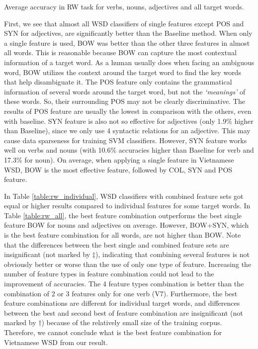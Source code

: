 \documentclass[english]{jnlp_1.4}
\begin{document}
\begin{table}[t]
\caption{Average accuracy in RW task for verbs, nouns, adjectives and all target words.}
\label{table:rw_all}

\vspace*{-1\Cvs}
\end{table}


First, we see that almost all WSD classifiers of single features 
except POS and SYN for adjectives,
are significantly better than the Baseline method.
When only a single feature is used, 
BOW was better than the other three features in almost all words.
This is reasonable because BOW can capture the most contextual information of a target word.
As a human usually does when facing an ambiguous word, 
BOW utilizes the context around the target word to find the key words that help disambiguate it. 
The POS feature only contains the grammatical information of several words around the target word,
but not the \textit{`meanings'} of these words.
So, their surrounding POS may not be clearly discriminative. 
The results of POS feature are usually the lowest in comparison with the others,
even with baseline.
SYN feature is also not so effective for adjectives
(only 1.9\% higher than Baseline),
since we only use 4 syntactic relations for an adjective. 
This may cause data sparseness for training SVM classifiers. 
However, SYN feature works well on verbs and nouns (with 10.6\% accuracies higher than Baseline for verb and 17.3\% for noun).
On average, when applying a single feature in Vietnamese WSD,
BOW is the most effective feature, followed by COL, SYN and POS feature. 

In Table \ref{table:rw_individual}, WSD classifiers with combined feature sets got equal or higher results compared to individual features
for some target words.
In Table \ref{table:rw_all}, 
the best feature combination outperforms the best single feature BOW for nouns and adjectives on average. However, 
BOW+SYN, which is the best feature combination for all words,
are not higher than BOW.
Note that the differences between the best single and combined feature sets are insignificant (not marked by $\ddagger$),
indicating that combining several features is not obviously better or worse than the use of only one type of feature.
Increasing the number of feature types in feature combination could not lead to the improvement of accuracies.
The 4 feature types combination is better than the combination of 2 or 3 features only for one verb (V7).
Furthermore, the best feature combinations are different for individual target words,
and differences 
between the best and second best of feature combination
are insignificant (not marked by $\dagger$)
because of the relatively small size of the training corpus.
Therefore, we cannot conclude what is the best feature combination for Vietnamese WSD from our result.
\end{document}

